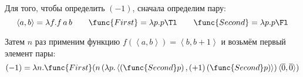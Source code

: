Для того, чтобы определить $(-1)$, сначала определим пару:
\[
\left<a,b\right> = \lambda f.f \mathinner{a} b \qquad
\func{First} = \lambda p . p \Tl \qquad
\func{Second} = \lambda p . p \Fl
\]%

Затем $n$ раз применим функцию $f\left(\left<a,b\right>\right) = \left<b,b+1\right>$ и возьмём первый элемент пары:
\[
(-1) = \lambda n . \func{First}
(n \mathinner{(\lambda p . \left<\left(\func{Second} p\right), \mathinner{(+1)} (\func{Second} p)\right>)}
\langle\overline{0},\overline{0}\rangle)
\]
